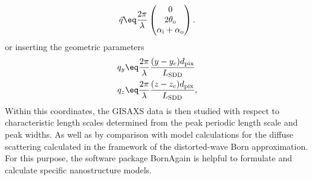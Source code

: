 \documentclass[\main/dresen_thesis.tex]{subfiles}
\begin{document}
    \begin{align}
      \vec{q} \eq \frac{2 \pi}{\lambda} \begin{pmatrix}
        0\\
        2 \theta_\mathrm{o}\\
        \alpha_\mathrm{i} + \alpha_\mathrm{o}
      \end{pmatrix}.
    \end{align}
    or inserting the geometric parameters
    \begin{align}
      \begin{split}
        q_y &\eq \frac{2 \pi}{\lambda} \frac{(y - y_c) d_\mathrm{pix}}{L_\mathrm{SDD}}\\
        q_z &\eq \frac{2 \pi}{\lambda} \frac{(z - z_c) d_\mathrm{pix}}{L_\mathrm{SDD}},
      \end{split}
    \end{align}
    Within this coordinates, the GISAXS data is then studied with respect to characteristic length scales determined from the peak periodic length scale and peak widths.
    As well as by comparison with model calculations for the diffuse scattering calculated in the framework of the distorted-wave Born approximation.
    For this purpose, the software package BornAgain \cite{Burle_2018_borna} is helpful to formulate and calculate specific nanostructure models.
\end{document}
